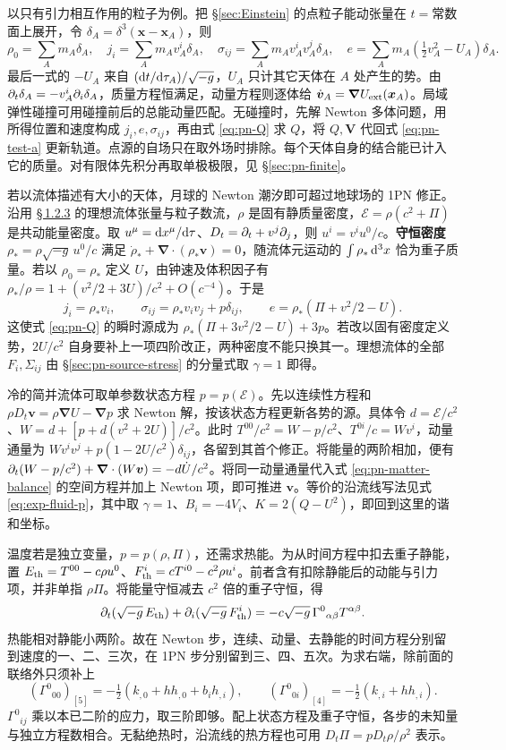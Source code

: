 以只有引力相互作用的粒子为例。把 \S\ref{sec:Einstein} 的点粒子能动张量在 $t=\text{常数}$ 面上展开，令 $\delta_A=\delta^3(\bm x-\bm x_A)$，则
\[
 \rho_0=\sum_A m_A\delta_A,\quad j_i=\sum_A m_A v_A^i\delta_A,\quad
 \sigma_{ij}=\sum_A m_A v_A^iv_A^j\delta_A,\quad
 e=\sum_A m_A(\tfrac12v_A^2-U_A)\delta_A .
\]
最后一式的 $-U_A$ 来自 $(\dd t/\dd\tau_A)/\sqrt{-g}$，$U_A$ 只计其它天体在 $A$ 处产生的势。由 $\partial_t\delta_A=-v_A^i\partial_i\delta_A$，质量方程恒满足，动量方程则逐体给 $\dot{\bm v}_A=\bm\nabla U_{\rm ext}(\bm x_A)$。局域弹性碰撞可用碰撞前后的总能动量匹配。无碰撞时，先解 Newton 多体问题，用所得位置和速度构成 $j_i,e,\sigma_{ij}$，再由式 \eqref{eq:pn-Q} 求 $Q$，将 $Q,\bm V$ 代回式 \eqref{eq:pn-test-a} 更新轨道。点源的自场只在取外场时排除。每个天体自身的结合能已计入它的质量。对有限体先积分再取单极极限，见 \S\ref{sec:pn-finite}。

若以流体描述有大小的天体，月球的 Newton 潮汐即可超过地球场的 1PN 修正。沿用 \hyperlink{subsection.1.2.3}{\S\,1.2.3} 的理想流体张量与粒子数流，$\rho$ 是固有静质量密度，$\mathcal E=\rho(c^2+\Pi)$ 是共动能量密度。取 $u^\mu=\dd x^\mu/\dd\tau$、$D_t=\partial_t+v^j\partial_j$，则 $u^i=v^iu^0/c$。\textbf{守恒密度} $\rho_*=\rho\sqrt{-g}\,u^0/c$ 满足 $\dot\rho_*+\bm\nabla\cdot(\rho_*\bm v)=0$，随流体元运动的 $\int\rho_*\,\dd^3x$ 恰为重子质量。若以 $\rho_0=\rho_*$ 定义 $U$，由钟速及体积因子有 $\rho_*/\rho=1+(v^2/2+3U)/c^2+O(c^{-4})$。于是
\[
 j_i=\rho_*v_i,\qquad \sigma_{ij}=\rho_*v_iv_j+p\delta_{ij},\qquad
 e=\rho_*(\Pi+v^2/2-U).
\]
这使式 \eqref{eq:pn-Q} 的瞬时源成为 $\rho_*(\Pi+3v^2/2-U)+3p$。若改以固有密度定义势，$2U/c^2$ 自身要补上一项四阶改正，两种密度不能只换其一。理想流体的全部 $F_i,\Sigma_{ij}$ 由 \S\ref{sec:pn-source-stress} 的分量式取 $\gamma=1$ 即得。

冷的简并流体可取单参数状态方程 $p=p(\mathcal E)$。先以连续性方程和 $\rho D_t\bm v=\rho\bm\nabla U-\bm\nabla p$ 求 Newton 解，按该状态方程更新各势的源。具体令 $d=\mathcal E/c^2$、$W=d+[p+d(v^2+2U)]/c^2$。此时 $T^{00}/c^2=W-p/c^2$、$T^{0i}/c=Wv^i$，动量通量为 $Wv^iv^j+p(1-2U/c^2)\delta_{ij}$，各留到其首个修正。将能量的两阶相加，便有 $\partial_t(W-p/c^2)+\bm\nabla\cdot(W\bm v)=-d\dot U/c^2$。将同一动量通量代入式 \eqref{eq:pn-matter-balance} 的空间方程并加上 Newton 项，即可推进 $\bm v$。等价的沿流线写法见式 \eqref{eq:exp-fluid-p}，其中取 $\gamma=1$、$B_i=-4V_i$、$K=2(Q-U^2)$，即回到这里的谐和坐标。

温度若是独立变量，$p=p(\rho,\Pi)$，还需求热能。为从时间方程中扣去重子静能，置 $E_{\rm th}=T^{00}-c\rho u^0$、$F^i_{\rm th}=cT^{i0}-c^2\rho u^i$。前者含有扣除静能后的动能与引力项，并非单指 $\rho\Pi$。将能量守恒减去 $c^2$ 倍的重子守恒，得
\[
 \partial_t(\sqrt{-g}\,E_{\rm th})+\partial_i(\sqrt{-g}\,F^i_{\rm th})
 =-c\sqrt{-g}\,\Gamma^0{}_{\alpha\beta}T^{\alpha\beta}.
\]
热能相对静能小两阶。故在 Newton 步，连续、动量、去静能的时间方程分别留到速度的一、二、三次，在 1PN 步分别留到三、四、五次。为求右端，除前面的联络外只须补上
\[
 (\Gamma^0{}_{00})_{[5]}=-\tfrac12(k_{,0}+h h_{,0}+b_i h_{,i}),\qquad
 (\Gamma^0{}_{0i})_{[4]}=-\tfrac12(k_{,i}+h h_{,i}).
\]
$\Gamma^0{}_{ij}$ 乘以本已二阶的应力，取三阶即够。配上状态方程及重子守恒，各步的未知量与独立方程数相合。无黏绝热时，沿流线的热方程也可用 $D_t\Pi=pD_t\rho/\rho^2$ 表示。

